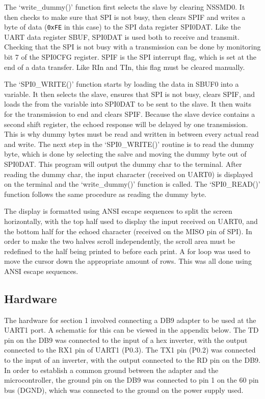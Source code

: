 \documentclass[12pt]{article}
\begin{document}
The `write\_dummy()' function first selects the slave by clearing NSSMD0. It then checks to make sure that SPI is not busy, then clears SPIF and writes a byte of data (\texttt{0xFE} in this case) to the SPI data register SPI0DAT. Like the UART data register SBUF, SPI0DAT is used both to receive and transmit. Checking that the SPI is not busy with a transmission can be done by monitoring bit 7 of the SPI0CFG register. SPIF is the SPI interrupt flag, which is set at the end of a data transfer. Like RIn and TIn, this flag must be cleared manually. 

The `SPI0\_WRITE()' function starts by loading the data in SBUF0 into a variable. It then selects the slave, ensures that SPI is not busy, clears SPIF, and loads the from the variable into SPI0DAT to be sent to the slave. It then waits for the transmission to end and clears SPIF. Because the slave device contains a second shift register, the echoed response will be delayed by one transmission. This is why dummy bytes must be read and written in between every actual read and write. The next step in the `SPI0\_WRITE()' routine is to read the dummy byte, which is done by selecting the salve and moving the dummy byte out of SPI0DAT. This program will output the dummy char to the terminal. After reading the dummy char, the input character (received on UART0) is displayed on the terminal and the `write\_dummy()' function is called. The `SPI0\_READ()' function follows the same procedure as reading the dummy byte.

The display is formatted using ANSI escape sequences to split the screen horizontally, with the top half used to display the input received on UART0, and the bottom half for the echoed character (received on the MISO pin of SPI). In order to make the two halves scroll independently, the scroll area must be redefined to the half being printed to before each print. A for loop was used to move the cursor down the appropriate amount of rows. This was all done using ANSI escape sequences.
\subsection{Hardware}
The hardware for section 1 involved connecting a DB9 adapter to be used at the UART1 port. A schematic for this can be viewed in the appendix below. The TD pin on the DB9 was connected to the input of a hex inverter, with the output connected to the RX1 pin of UART1 (P0.3). The TX1 pin (P0.2) was connected to the input of an inverter, with the output connected to the RD pin on the DB9. In order to establish a common ground between the adapter and the microcontroller, the ground pin on the DB9 was connected to pin 1 on the 60 pin bus (DGND), which was connected to the ground on the power supply used. 
 
\end{document}
